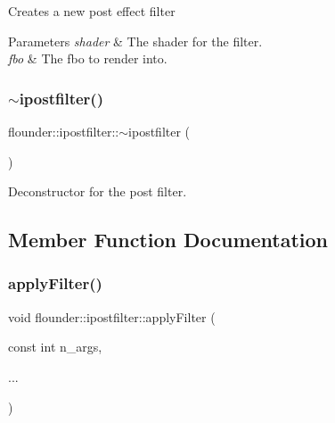 Creates a new post effect filter 


\begin{DoxyParams}{Parameters}
{\em shader} & The shader for the filter. \\
\hline
{\em fbo} & The fbo to render into. \\
\hline
\end{DoxyParams}
\mbox{\label{classflounder_1_1ipostfilter_aca15b2f21a5f07ddcff5dcad764e137c}} 
\subsubsection{\texorpdfstring{$\sim$ipostfilter()}{~ipostfilter()}}
{\footnotesize\ttfamily flounder\+::ipostfilter\+::$\sim$ipostfilter (\begin{DoxyParamCaption}{ }\end{DoxyParamCaption})\hspace{0.3cm}{\ttfamily [virtual]}}



Deconstructor for the post filter. 



\subsection{Member Function Documentation}
\mbox{\label{classflounder_1_1ipostfilter_a34cced83864d9d6b1c664a0337cd97b2}} 
\subsubsection{\texorpdfstring{apply\+Filter()}{applyFilter()}\hspace{0.1cm}{\footnotesize\ttfamily [1/2]}}
{\footnotesize\ttfamily void flounder\+::ipostfilter\+::apply\+Filter (\begin{DoxyParamCaption}\item[{const int}]{n\+\_\+args,  }\item[{}]{... }\end{DoxyParamCaption})}



